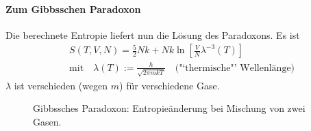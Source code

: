 \paragraph{Zum Gibbsschen Paradoxon}

Die berechnete Entropie liefert nun die Lösung des Paradoxons. Es ist
\begin{equation}
    \begin{split}
        &  S(T, V, N) = \frac{5}{2} N k + N k \ln \left[ \frac{V}{N} \lambda^{-3}(T) \right] \\
        & \text{mit} \quad \lambda(T) := \frac{h}{\sqrt{2 \pi m k T}} \quad \text{("`thermische"' Wellenlänge)}
    \end{split}
\end{equation}
$\lambda$ ist verschieden (wegen $m$) für verschiedene Gase.

\begin{figure}[H]
        \centering
        \def\svgwidth{0.5\textwidth}
        
        \caption{Gibbssches Paradoxon: Entropieänderung bei Mischung von zwei Gasen.}
        \label{img:gibbsParadoxon}
\end{figure}

